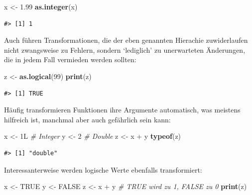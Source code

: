 \documentclass[]{tufte-book}
\newenvironment{Shaded}{}{}
\newcommand{\KeywordTok}[1]{\textcolor[rgb]{0.00,0.44,0.13}{\textbf{#1}}}
\newcommand{\DecValTok}[1]{\textcolor[rgb]{0.25,0.63,0.44}{#1}}
\newcommand{\FloatTok}[1]{\textcolor[rgb]{0.25,0.63,0.44}{#1}}
\newcommand{\StringTok}[1]{\textcolor[rgb]{0.25,0.44,0.63}{#1}}
\newcommand{\CommentTok}[1]{\textcolor[rgb]{0.38,0.63,0.69}{\textit{#1}}}
\newcommand{\OtherTok}[1]{\textcolor[rgb]{0.00,0.44,0.13}{#1}}
\newcommand{\OperatorTok}[1]{\textcolor[rgb]{0.40,0.40,0.40}{#1}}
\newcommand{\NormalTok}[1]{#1}
\begin{document}
\begin{Shaded}
\begin{Highlighting}[]
\NormalTok{x <-}\StringTok{ }\FloatTok{1.99}
\KeywordTok{as.integer}\NormalTok{(x)}
\end{Highlighting}
\end{Shaded}

\begin{verbatim}
#> [1] 1
\end{verbatim}

Auch führen Transformationen, die der eben genannten Hierachie
zuwiderlaufen nicht zwangsweise zu Fehlern, sondern `lediglich' zu
unerwarteten Änderungen, die in jedem Fall vermieden werden sollten:

\begin{Shaded}
\begin{Highlighting}[]
\NormalTok{z <-}\StringTok{ }\KeywordTok{as.logical}\NormalTok{(}\DecValTok{99}\NormalTok{)}
\KeywordTok{print}\NormalTok{(z)}
\end{Highlighting}
\end{Shaded}

\begin{verbatim}
#> [1] TRUE
\end{verbatim}

Häufig transformieren Funktionen ihre Argumente automatisch, was
meistens hilfreich ist, manchmal aber auch gefährlich sein kann:

\begin{Shaded}
\begin{Highlighting}[]
\NormalTok{x <-}\StringTok{ }\NormalTok{1L  }\CommentTok{# Integer}
\NormalTok{y <-}\StringTok{ }\DecValTok{2}  \CommentTok{# Double}
\NormalTok{z <-}\StringTok{ }\NormalTok{x }\OperatorTok{+}\StringTok{ }\NormalTok{y}
\KeywordTok{typeof}\NormalTok{(z)}
\end{Highlighting}
\end{Shaded}

\begin{verbatim}
#> [1] "double"
\end{verbatim}

Interessanterweise werden logische Werte ebenfalls transformiert:

\begin{Shaded}
\begin{Highlighting}[]
\NormalTok{x <-}\StringTok{ }\OtherTok{TRUE}
\NormalTok{y <-}\StringTok{ }\OtherTok{FALSE}
\NormalTok{z <-}\StringTok{ }\NormalTok{x }\OperatorTok{+}\StringTok{ }\NormalTok{y  }\CommentTok{# TRUE wird zu 1, FALSE zu 0}
\KeywordTok{print}\NormalTok{(z)}
\end{Highlighting}
\end{Shaded}
\end{document}
